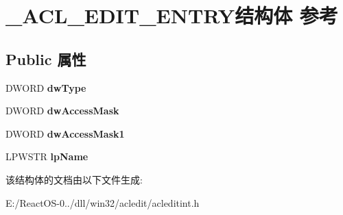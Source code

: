 \hypertarget{struct___a_c_l___e_d_i_t___e_n_t_r_y}{}\section{\+\_\+\+A\+C\+L\+\_\+\+E\+D\+I\+T\+\_\+\+E\+N\+T\+R\+Y结构体 参考}
\label{struct___a_c_l___e_d_i_t___e_n_t_r_y}
\subsection*{Public 属性}
\begin{DoxyCompactItemize}
\item 
\mbox{\label{struct___a_c_l___e_d_i_t___e_n_t_r_y_a093a68cce776c1c8a8ffa0b5877cbcc1}} 
D\+W\+O\+RD {\bfseries dw\+Type}
\item 
\mbox{\label{struct___a_c_l___e_d_i_t___e_n_t_r_y_a5854310a416529597b34458b2e22a4ed}} 
D\+W\+O\+RD {\bfseries dw\+Access\+Mask}
\item 
\mbox{\label{struct___a_c_l___e_d_i_t___e_n_t_r_y_a4e1ca29e0a5ea2c612dbef2c5ff1c7cf}} 
D\+W\+O\+RD {\bfseries dw\+Access\+Mask1}
\item 
\mbox{\label{struct___a_c_l___e_d_i_t___e_n_t_r_y_abb8bff68ef26582d98f960ec19e3e110}} 
L\+P\+W\+S\+TR {\bfseries lp\+Name}
\end{DoxyCompactItemize}


该结构体的文档由以下文件生成\+:\begin{DoxyCompactItemize}
\item 
E\+:/\+React\+O\+S-\/0../dll/win32/acledit/acleditint.\+h\end{DoxyCompactItemize}
